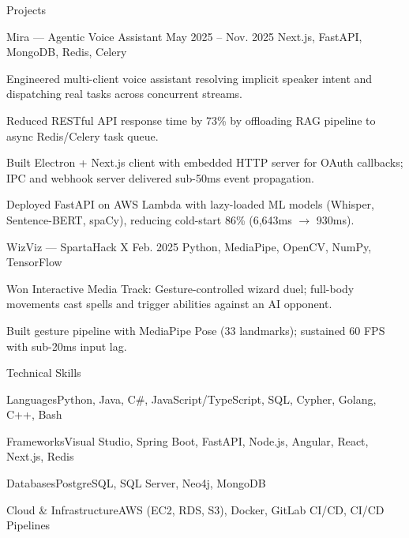 \documentclass[
	11pt
]{../../../resume}
\begin{document}
	\begin{rSection}{P}{rojects}
		\begin{rSectionEntry}
			{Mira --- Agentic Voice Assistant}
			{May 2025 -- Nov. 2025}
			{}
			{Next.js, FastAPI, MongoDB, Redis, Celery}
			{}

			\item Engineered multi-client voice assistant resolving implicit speaker intent and dispatching real tasks across concurrent streams.
			\item Reduced RESTful API response time by 73\% by offloading RAG pipeline to async Redis/Celery task queue.
			\item Built Electron + Next.js client with embedded HTTP server for OAuth callbacks; IPC and webhook server delivered sub-50ms event propagation.
			\item Deployed FastAPI on AWS Lambda with lazy-loaded ML models (Whisper, Sentence-BERT, spaCy), reducing cold-start 86\% (6{,}643ms $\rightarrow$ 930ms).
		\end{rSectionEntry}

		\begin{rSectionEntry}
			{WizViz --- SpartaHack X}
			{Feb. 2025}
			{}
			{Python, MediaPipe, OpenCV, NumPy, TensorFlow}
			{}

			\item Won Interactive Media Track: Gesture-controlled wizard duel; full-body movements cast spells and trigger abilities against an AI opponent.
			\item Built gesture pipeline with MediaPipe Pose (33 landmarks); sustained 60 FPS with sub-20ms input lag.
		\end{rSectionEntry}
	\end{rSection}

	\begin{rSection}{T}{echnical Skills}
		\begin{rSet}{Languages}{Python, Java, C\#, JavaScript/TypeScript, SQL, Cypher, Golang, C++, Bash}
		\end{rSet}
		\begin{rSet}{Frameworks}{Visual Studio, Spring Boot, FastAPI, Node.js, Angular, React, Next.js, Redis}
		\end{rSet}
		\begin{rSet}{Databases}{PostgreSQL, SQL Server, Neo4j, MongoDB}
		\end{rSet}
		\begin{rSet}{Cloud \& Infrastructure}{AWS (EC2, RDS, S3), Docker, GitLab CI/CD, CI/CD Pipelines}
		\end{rSet}
	\end{rSection}
\end{document}
